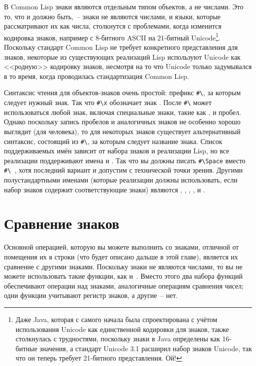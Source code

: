 В Common Lisp знаки являются отдельным типом объектов, а не числами.  Это то, что и должно
быть,~-- знаки не являются числами, и языки, которые рассматривают их как числа, столкнутся
с проблемами, когда изменится кодировка знаков, например с 8-битного ASCII на 21-битный
Unicode\footnote{Даже Java, которая с самого начала была спроектирована с учётом
  использования Unicode как единственной кодировки для знаков, также столкнулась с
  трудностями, поскольку знаки в Java определены как 16-битные значения, а стандарт
  Unicode 3.1 расширил набор знаков Unicode, так что он теперь требует 21-битного
  представления.  Ой!}.  Поскольку стандарт Common Lisp не требует конкретного
представления для знаков, некоторые из существующих реализаций Lisp используют Unicode как
<<родную>> кодировку знаков, несмотря на то что Unicode только задумывался в то время,
когда проводилась стандартизация Common Lisp.

Синтаксис чтения для объектов-знаков очень простой: префикс \lstinline!#\!, за которым
следует нужный знак.  Так что \lstinline!#\x! обозначает знак .  После
\lstinline!#\! может использоваться любой знак, включая специальные знаки, такие как
, \code{(} и пробел.  Однако поскольку запись пробелов и аналогичных знаков не
особенно хорошо выглядит (для человека), то для некоторых знаков существует альтернативный
синтаксис, состоящий из \lstinline!#\!, за которым следует название знака.  Список
поддерживаемых имён зависит от набора знаков и реализации Lisp, но все реализации
поддерживают имена  и .  Так что вы должны писать
\lstinline!#\Space! вместо \lstinline!#\ !, хотя последний вариант и допустим с
технической точки зрения.  Другими полустандартными именами (которые реализации должны
использовать, если набор знаков содержит соответствующие знаки) являются ,
, , ,  и .

\section{Сравнение знаков}

Основной операцией, которую вы можете выполнить со знаками, отличной от помещения их в
строки (что будет описано дальше в этой главе), является их сравнение с другими знаками.
Поскольку знаки не являются числами, то вы не можете использовать такие функции, как
\code{<} и~\code{>}.  Вместо этого два набора функций обеспечивают операции над знаками,
аналогичные операциям сравнения чисел; одни функции учитывают регистр знаков, а другие~--
нет.

